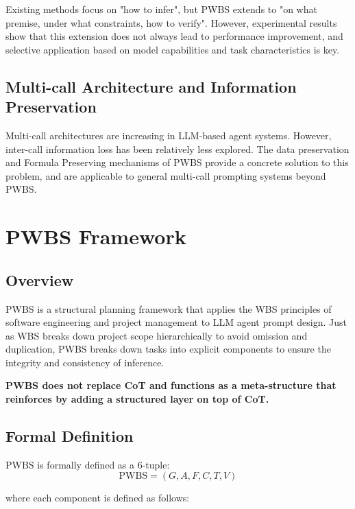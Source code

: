 \documentclass[11pt,a4paper]{article}
\begin{document}
Existing methods focus on "how to infer", but PWBS extends to "on what premise, under what constraints, how to verify". However, experimental results show that this extension does not always lead to performance improvement, and selective application based on model capabilities and task characteristics is key.

\subsection{Multi-call Architecture and Information Preservation}

Multi-call architectures are increasing in LLM-based agent systems. However, inter-call information loss has been relatively less explored. The data preservation and Formula Preserving mechanisms of PWBS provide a concrete solution to this problem, and are applicable to general multi-call prompting systems beyond PWBS.

\section{PWBS Framework}

\subsection{Overview}

PWBS is a structural planning framework that applies the WBS principles of software engineering and project management to LLM agent prompt design. Just as WBS breaks down project scope hierarchically to avoid omission and duplication, PWBS breaks down tasks into explicit components to ensure the integrity and consistency of inference.

\textbf{PWBS does not replace CoT and functions as a meta-structure that reinforces by adding a structured layer on top of CoT.}

\subsection{Formal Definition}

PWBS is formally defined as a 6-tuple:
\begin{equation}
\text{PWBS} = (G, A, F, C, T, V)
\end{equation}

\noindent where each component is defined as follows:
\end{document}
